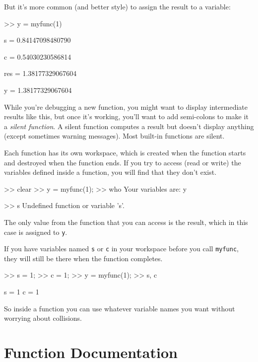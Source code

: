 But it's more common (and better style) to assign the result to
a variable:

\begin{code}
>> y = myfunc(1)

s = 0.84147098480790

c = 0.54030230586814

res = 1.38177329067604

y = 1.38177329067604
\end{code}

While you're debugging a new function, you might want to display
intermediate results like this, but once it's working, you'll want
to add semi-colons to make it a {\em silent function}.  A silent function
computes a result but doesn't display
anything (except sometimes warning messages). Most built-in
functions are silent.


Each function has its own workspace, which is created when the
function starts and destroyed when the function ends.  If you try to
access (read or write) the variables defined inside a function, you
will find that they don't exist.

\begin{code}
>> clear
>> y = myfunc(1);
>> who
Your variables are: y

>> s
Undefined function or variable 's'.
\end{code}

The only value from the function that you can access is the result,
which in this case is assigned to {\tt y}.

If you have variables named {\tt s} or {\tt c} in your workspace
before you call {\tt myfunc}, they will still be there when the
function completes.

\begin{code}
>> s = 1;
>> c = 1;
>> y = myfunc(1);
>> s, c

s = 1
c = 1
\end{code}

So inside a function you can use whatever variable names you
want without worrying about collisions.



\section{Function Documentation}

